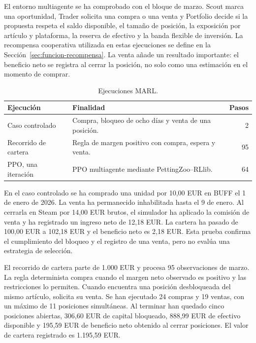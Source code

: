 El entorno multiagente se ha comprobado con el bloque de marzo. Scout marca una oportunidad, Trader solicita una compra o una venta y Portfolio decide si la propuesta respeta el saldo disponible, el tamaño de posición, la exposición por artículo y plataforma, la reserva de efectivo y la banda flexible de inversión. La recompensa cooperativa utilizada en estas ejecuciones se define en la Sección~\ref{sec:funcion-recompensa}. La venta añade un resultado importante: el beneficio neto se registra al cerrar la posición, no solo como una estimación en el momento de comprar.

\begin{table}[H]
\centering
\begin{tabularx}{\textwidth}{>{\raggedright\arraybackslash}p{} >{\raggedright\arraybackslash}X r}
\toprule
Ejecución & Finalidad & Pasos \\
\midrule
Caso controlado & Compra, bloqueo de ocho días y venta de una posición. & 2 \\
Recorrido de cartera & Regla de margen positivo con compra, espera y venta. & 95 \\
PPO, una iteración & PPO multiagente mediante PettingZoo--RLlib. & 64 \\
\bottomrule
\end{tabularx}
\caption{Ejecuciones MARL.}
\label{tab:marl-inicial}
\end{table}

En el caso controlado se ha comprado una unidad por 10,00 EUR en BUFF el 1 de enero de 2026. La venta ha permanecido inhabilitada hasta el 9 de enero. Al cerrarla en Steam por 14,00 EUR brutos, el simulador ha aplicado la comisión de venta y ha registrado un ingreso neto de 12,18 EUR. La cartera ha pasado de 100,00 EUR a 102,18 EUR y el beneficio neto es 2,18 EUR. Esta prueba confirma el cumplimiento del bloqueo y el registro de una venta, pero no evalúa una estrategia de selección.

El recorrido de cartera parte de 1.000 EUR y procesa 95 observaciones de marzo. La regla determinista compra cuando el margen neto observado es positivo y las restricciones lo permiten. Cuando encuentra una posición desbloqueada del mismo artículo, solicita su venta. Se han ejecutado 24 compras y 19 ventas, con un máximo de 11 posiciones simultáneas. Al terminar han quedado cinco posiciones abiertas, 306,60 EUR de capital bloqueado, 888,99 EUR de efectivo disponible y 195,59 EUR de beneficio neto obtenido al cerrar posiciones. El valor de cartera registrado es 1.195,59 EUR.

